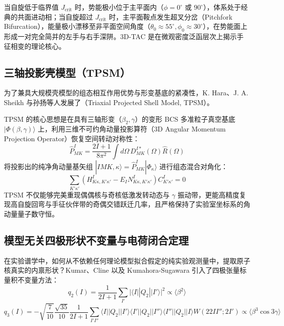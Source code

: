当自旋低于临界值 $J_{\text{crit}}$ 时，势能极小位于主平面内（$\phi = 0^\circ$ 或 $90^\circ$），体系处于经典的共面进动相；当自旋超过 $J_{\text{crit}}$ 时，主平面鞍点发生超叉分岔（Pitchfork Bifurcation），能量极小漂移至非平面空间角度（$\theta_0 \approx 55^\circ, \phi_0 \approx 30^\circ$），在势能面上形成一对完全简并的左手与右手深阱。3D-TAC 是在微观密度泛函层次上揭示手征相变的理论核心。

\subsection{三轴投影壳模型（TPSM）}

为了兼具大规模壳模型的组态相互作用优势与形变基底的紧凑性，K. Hara、J. A. Sheikh 与孙扬等人发展了（Triaxial Projected Shell Model, TPSM）。

TPSM 的核心思想是在具有三轴形变（$\beta_2, \gamma$）的变形 BCS 多准粒子真空基底 $|\Phi(\beta, \gamma)\rangle$ 上，利用三维不可约角动量投影算符（3D Angular Momentum Projection Operator）恢复空间转动对称性：
\begin{equation}
    \hat{P}_{MK}^I = \frac{2I+1}{8\pi^2} \int d\Omega \, D_{MK}^{I*}(\Omega) \hat{R}(\Omega)
    \label{eq:projection_operator}
\end{equation}
将投影出的纯净角动量基矢组 $|I M K, \kappa\rangle = \hat{P}_{MK}^I |\Phi_\kappa\rangle$ 进行组态混合对角化：
\begin{equation}
    \sum_{K' \kappa'} \left( H_{K \kappa, K' \kappa'}^I - E_I N_{K \kappa, K' \kappa'}^I \right) C_{K' \kappa'}^I = 0
    \label{eq:tpsm_secular}
\end{equation}
TPSM 不仅能够完美重现偶偶核与奇核低激发转动态与 $\gamma$ 振动带，更能高精度复现高自旋回弯与手征伙伴带的奇偶交错跃迁几率，且严格保持了实验室坐标系的角动量量子数守恒。

\subsection{模型无关四极形状不变量与电荷闭合定理}

在实验谱学中，如何从不依赖任何理论模型拟合假定的纯实验观测量中，提取原子核真实的内禀形状？Kumar、Cline 以及 Kumahora-Sugawara 引入了四极张量标量积不变量方法：
\begin{equation}
    q_2(I) = \frac{1}{2I+1} \sum_{I'} |\langle I || Q_2 || I' \rangle|^2 \propto \langle \beta^2 \rangle
\end{equation}
\begin{equation}
    q_3(I) = -\sqrt{\frac{7}{10}} \frac{\sqrt{35}}{10} \frac{1}{2I+1} \sum_{I' I''} \langle I || Q_2 || I' \rangle \langle I' || Q_2 || I'' \rangle \langle I'' || Q_2 || I \rangle W(2 2 I I''; 2 I') \propto \langle \beta^3 \cos 3\gamma \rangle
\end{equation}

